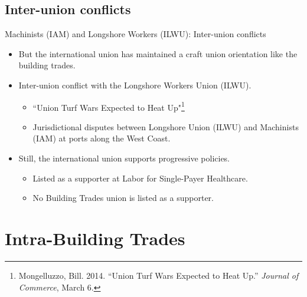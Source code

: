 \documentclass{beamer}
\begin{document}
\subsection{Inter-union conflicts}
\begin{frame}{Machinists (IAM) and Longshore Workers (ILWU): Inter-union conflicts}
	\begin{itemize}
		\item But the international union has maintained a craft union orientation like the building trades.
		\item Inter-union conflict with the Longshore Workers Union (ILWU).
		\begin{itemize}
			\item ``Union Turf Wars Expected to Heat Up"\footnote{\tiny Mongelluzzo, Bill. 2014. “Union Turf Wars Expected to Heat Up.” \textit{Journal of Commerce}, March 6.}
			\item Jurisdictional disputes between Longshore Union (ILWU) and Machinists (IAM) at ports along the West Coast.
		\end{itemize}
	\item Still, the international union supports progressive policies.
		\begin{itemize}
			\item Listed as a supporter at Labor for Single-Payer Healthcare.
			\item No Building Trades union is listed as a supporter.
		\end{itemize}
	\end{itemize}
\end{frame}
	


\section{Intra-Building Trades}
\end{document}
